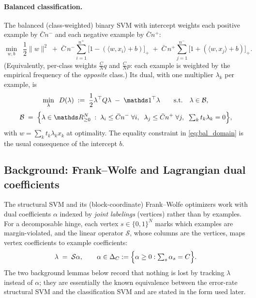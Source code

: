\paragraph{Balanced classification.}
The balanced (class-weighted) binary SVM with intercept weights each positive
example by $\bar{C} n^-$ and each negative example by $\bar{C} n^+$:
\begin{equation}
\min_{w, b}\;\; \frac{1}{2}\|w\|^2
\;+\; \bar{C}\, n^- \sum_{i=1}^{n^+} \bigl[ 1 - (\langle w, x_i\rangle + b) \bigr]_+
\;+\; \bar{C}\, n^+ \sum_{j=1}^{n^-} \bigl[ 1 + (\langle w, x_j\rangle + b) \bigr]_+ .
\label{eq:bal_primal}
\end{equation}
(Equivalently, per-class weights $\tfrac{C}{N}q$ and $\tfrac{C}{N}p$: each
example is weighted by the empirical frequency of the \emph{opposite} class.)
Its dual, with one multiplier $\lambda_k$ per example, is
\begin{equation}
\min_{\lambda}\;\; D(\lambda) \;:=\; \frac{1}{2}\lambda^\top Q \lambda
\;-\; \mathbbm{1}^\top \lambda
\qquad \text{s.t.} \quad \lambda \in \mathcal{B},
\label{eq:bal_dual}
\end{equation}
\begin{equation}
\mathcal{B} \;=\; \Bigl\{ \lambda \in \mathbbm{R}^N_{\ge 0} \;:\;
\lambda_i \le \bar{C} n^- \;\forall i, \;\;
\lambda_j \le \bar{C} n^+ \;\forall j, \;\;
\textstyle\sum_k t_k \lambda_k = 0 \Bigr\},
\label{eq:bal_domain}
\end{equation}
with $w = \sum_k t_k \lambda_k x_k$ at optimality. The equality constraint in
\eqref{eq:bal_domain} is the usual consequence of the intercept $b$.

\subsection{Background: Frank--Wolfe and Lagrangian dual coefficients}
\label{sec:background}

The structural SVM and its (block-coordinate) Frank--Wolfe optimizers
\citep{joachims2005,joachims2006,lacostejulien2013}
work with dual coefficients $\alpha$ indexed by \emph{joint labelings}
(vertices) rather than by examples. For a decomposable hinge, each vertex
$s \in \{0,1\}^N$ marks which examples are margin-violated, and the linear
operator $\mathcal{S}$, whose columns are the vertices, maps vertex
coefficients to example coefficients:
\begin{equation}
\lambda \;=\; \mathcal{S}\alpha,
\qquad
\alpha \in \Delta_C := \Bigl\{ \alpha \ge 0 : \textstyle\sum_s \alpha_s = C \Bigr\}.
\label{eq:wolfe_map}
\end{equation}
The two background lemmas below record that nothing is lost by tracking
$\lambda$ instead of $\alpha$; they are essentially the known equivalence
between the error-rate structural SVM and the classification SVM
\citep[Theorem~1]{joachims2006} and are stated in the form used later.

